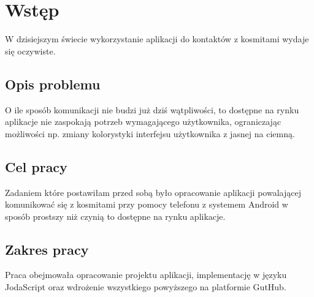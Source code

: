 \chapter*{Wstęp}

W dzisiejszym świecie wykorzystanie aplikacji do kontaktów z kosmitami wydaje się oczywiste. \lipsum[6]

\section*{Opis problemu}

O ile sposób komunikacji nie budzi już dziś wątpliwości, to dostępne na rynku aplikacje nie zaspokają potrzeb wymagającego użytkownika, ograniczając możliwości np. zmiany kolorystyki interfejsu użytkownika z jasnej na ciemną. \lipsum[8]

\section*{Cel pracy}

Zadaniem które postawiłam przed sobą było opracowanie aplikacji powalającej komunikować się z kosmitami przy pomocy telefonu z systemem Android w sposób prostszy niż czynią to dostępne na rynku aplikacje. \lipsum[8]

\section*{Zakres pracy}

Praca obejmowała opracowanie projektu aplikacji, implementację w języku JodaScript oraz wdrożenie wszystkiego powyższego na platformie GutHub. \lipsum[14]
\thispagestyle{normal}